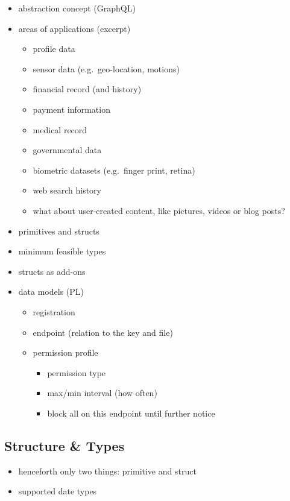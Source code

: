 \documentclass[12pt,english,a4paper,titlepage,cleardoublepage=empty,dottedtoc]{report}
\providecommand{\tightlist}{%
  \setlength{\itemsep}{0pt}\setlength{\parskip}{0pt}}
\begin{document}
\begin{itemize}
\tightlist
\item
  abstraction concept (GraphQL)
\item
  areas of applications (excerpt)

  \begin{itemize}
  \tightlist
  \item
    profile data
  \item
    sensor data (e.g.~geo-location, motions)
  \item
    financial record (and history)
  \item
    payment information
  \item
    medical record
  \item
    governmental data
  \item
    biometric datasets (e.g.~finger print, retina)
  \item
    web search history
  \item
    what about user-created content, like pictures, videos or blog
    posts?
  \end{itemize}
\item
  primitives and structs
\item
  minimum feasible types
\item
  structs as add-ons
\item
  data models (PL)

  \begin{itemize}
  \tightlist
  \item
    registration
  \item
    endpoint (relation to the key and file)
  \item
    permission profile

    \begin{itemize}
    \tightlist
    \item
      permission type
    \item
      max/min interval (how often)
    \item
      block all on this endpoint until further notice
    \end{itemize}
  \end{itemize}
\end{itemize}

\subsection{Structure \& Types}\label{structure-types}

\begin{itemize}
\tightlist
\item
  henceforth only two things: primitive and struct
\item
  supported date types
\end{itemize}
\end{document}
